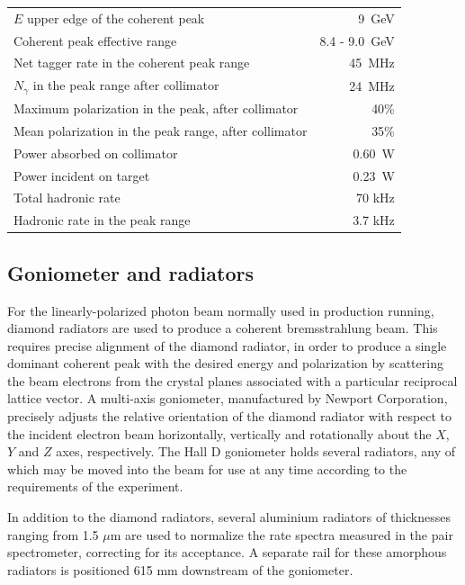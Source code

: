 \begin{table}[btp]
\begin{center}
\begin{tabular}{|l|r|}
\hline\hline
$E$ upper edge of the coherent peak & 9~GeV \\
Coherent peak effective range       & 8.4 - 9.0~GeV\\
Net tagger rate in the coherent peak range & 45~MHz  \\
$N_{\gamma}$ in the peak range after collimator & 24~MHz  \\
Maximum polarization in the peak, after collimator & 40\% \\
Mean polarization in the peak range, after collimator & 35\% \\
Power absorbed on collimator & 0.60~W \\
Power incident on target & 0.23~W \\
Total hadronic rate & 70 kHz \\
Hadronic rate in the peak range & 3.7 kHz \\
\hline\hline
\end{tabular}
\end{center}
\end{table}


\subsection{Goniometer and radiators \label{sec:radiators}}
For the linearly-polarized photon beam normally used in \GX{} production running, diamond radiators 
are used to produce a coherent bremsstrahlung beam. This requires precise alignment of the diamond
radiator, in order to produce a single dominant coherent peak with the desired energy and polarization
by scattering the beam electrons from the crystal planes associated with a particular reciprocal lattice
vector.
A multi-axis goniometer, manufactured by Newport Corporation, precisely
adjusts the relative orientation of the
diamond radiator with respect to the incident electron beam horizontally, vertically and rotationally about the $X$, $Y$ and $Z$ axes, respectively.
The Hall D goniometer holds several radiators, any of which may be moved into the beam for use at any time
according to the requirements of the experiment.

In addition to the diamond radiators, several aluminium radiators of thicknesses ranging from 1.5 $\mu$m are used to normalize the rate spectra measured in the pair spectrometer, correcting for its acceptance.
A separate rail for these amorphous radiators is 
positioned 615 mm downstream of the goniometer. 


